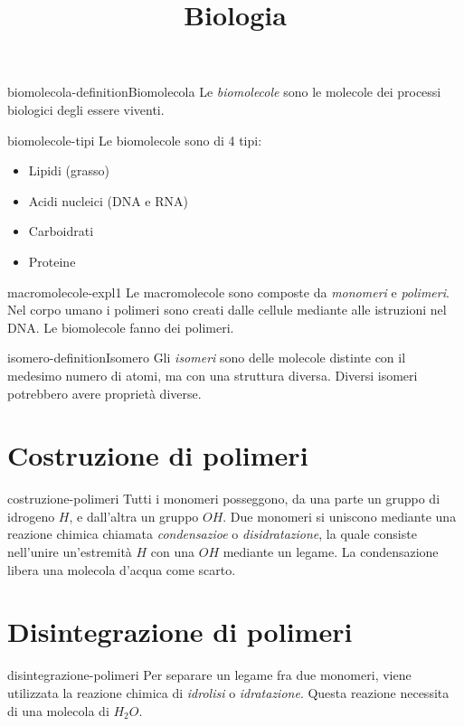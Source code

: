 \documentclass[preview]{standalone}
\begin{document}
\title{Biologia}
\genpage

\begin{snippetdefinition}{biomolecola-definition}{Biomolecola}
    Le \textit{biomolecole} sono le molecole dei processi biologici degli essere viventi.
\end{snippetdefinition}


\begin{snippet}{biomolecole-tipi}
    Le biomolecole sono di 4 tipi:
    \begin{itemize}
        \item Lipidi (grasso)
        \item Acidi nucleici (DNA e RNA)
        \item Carboidrati
        \item Proteine
    \end{itemize}
\end{snippet}

\begin{snippet}{macromolecole-expl1}
    Le macromolecole sono composte da \textit{monomeri} e \textit{polimeri}.
Nel corpo umano i polimeri sono creati dalle cellule mediante alle istruzioni nel DNA.
Le biomolecole fanno dei polimeri.
\end{snippet}

\begin{snippetdefinition}{isomero-definition}{Isomero}
    Gli \textit{isomeri} sono delle molecole distinte con il medesimo numero di atomi,
    ma con una struttura diversa. Diversi isomeri potrebbero avere proprietà diverse.
\end{snippetdefinition}

\section{Costruzione di polimeri}

\begin{snippet}{costruzione-polimeri}
    Tutti i monomeri posseggono, da una parte un gruppo di idrogeno \(H\),
e dall'altra un gruppo \(OH\).
Due monomeri si uniscono mediante una reazione chimica chiamata \textit{condensazioe} o \textit{disidratazione}, la quale consiste
nell'unire un'estremità \(H\) con una \(OH\) mediante un legame.
La condensazione libera una molecola d'acqua come scarto.
\end{snippet}

\section{Disintegrazione di polimeri}

\begin{snippet}{disintegrazione-polimeri}
    Per separare un legame fra due monomeri, viene utilizzata la reazione chimica di \textit{idrolisi} o \textit{idratazione}.
    Questa reazione necessita di una molecola di \(H_2O\).
\end{snippet}
\end{document}
